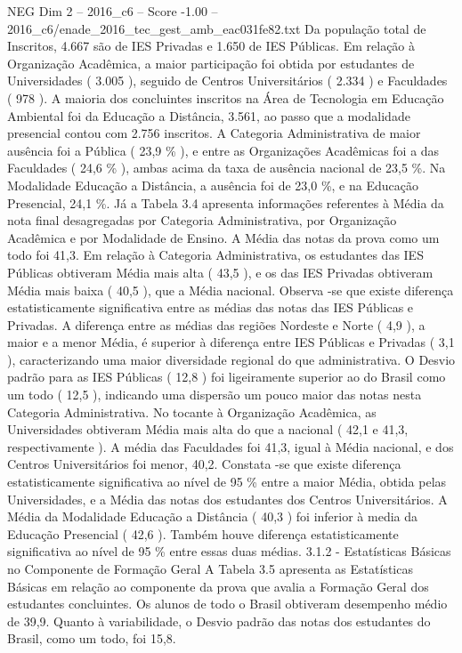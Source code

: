 \begin{textsample}{NEG Dim 2 – 2016\_c6 – Score -1.00 – 2016\_c6/enade\_2016\_tec\_gest\_amb\_eac031fe82.txt}
Da população total de Inscritos, 4.667 são de IES Privadas e 1.650 de IES Públicas.
Em relação à Organização Acadêmica, a maior participação foi obtida por estudantes de Universidades ( 3.005 ), seguido de Centros Universitários ( 2.334 ) e Faculdades ( 978 ).
A maioria dos concluintes inscritos na Área de Tecnologia em Educação Ambiental foi da Educação a Distância, 3.561, ao passo que a modalidade presencial contou com 2.756 inscritos.
A Categoria Administrativa de maior ausência foi a Pública ( 23,9 \% ), e entre as Organizações Acadêmicas foi a das Faculdades ( 24,6 \% ), ambas acima da taxa de ausência nacional de 23,5 \%.
Na Modalidade Educação a Distância, a ausência foi de 23,0 \%, e na Educação Presencial, 24,1 \%.
Já a Tabela 3.4 apresenta informações referentes à Média da nota final desagregadas por Categoria Administrativa, por Organização Acadêmica e por Modalidade de Ensino.
A Média das notas da prova como um todo foi 41,3.
Em relação à Categoria Administrativa, os estudantes das IES Públicas obtiveram Média mais alta ( 43,5 ), e os das IES Privadas obtiveram Média mais baixa ( 40,5 ), que a Média nacional.
Observa -se que existe diferença estatisticamente significativa entre as médias das notas das IES Públicas e Privadas.
A diferença entre as médias das regiões Nordeste e Norte ( 4,9 ), a maior e a menor Média, é superior à diferença entre IES Públicas e Privadas ( 3,1 ), caracterizando uma maior diversidade regional do que administrativa.
O Desvio padrão para as IES Públicas ( 12,8 ) foi ligeiramente superior ao do Brasil como um todo ( 12,5 ), indicando uma dispersão um pouco maior das notas nesta Categoria Administrativa.
No tocante à Organização Acadêmica, as Universidades obtiveram Média mais alta do que a nacional ( 42,1 e 41,3, respectivamente ).
A média das Faculdades foi 41,3, igual à Média nacional, e dos Centros Universitários foi menor, 40,2.
Constata -se que existe diferença estatisticamente significativa ao nível de 95 \% entre a maior Média, obtida pelas Universidades, e a Média das notas dos estudantes dos Centros Universitários.
A Média da Modalidade Educação a Distância ( 40,3 ) foi inferior à media da Educação Presencial ( 42,6 ).
Também houve diferença estatisticamente significativa ao nível de 95 \% entre essas duas médias. 3.1.2 - Estatísticas Básicas no Componente de Formação Geral A Tabela 3.5 apresenta as Estatísticas Básicas em relação ao componente da prova que avalia a Formação Geral dos estudantes concluintes.
Os alunos de todo o Brasil obtiveram desempenho médio de 39,9.
Quanto à variabilidade, o Desvio padrão das notas dos estudantes do Brasil, como um todo, foi 15,8.

\end{textsample}
